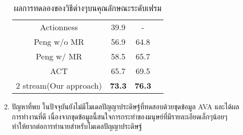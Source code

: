 \begin{enumerate}
\begin{enumerate}
\begin{table}[!ht]
\begin{tabular}{|c|c|c|c|}
					Actionness 			& 39.9				& 	-						\\
					Peng w/o MR			& 56.9				& 64.8						\\
					Peng w/  MR 			& 58.5				& 65.7						\\
					ACT					& 65.7				& 69.5						\\
					\hline
					2 stream(Our approach)		& \textbf{73.3}		& \textbf{76.3}				\\
					\hline
				\end{tabular}
				\caption{ผลการทดลองของวิธีต่างๆบนคุณลักษณะระดับเฟรม}
				\label{tab: transfer learning}
			\end{table}
		\item ปัญหาที่พบ
		ในปัจจุบันยังไม่มีโมเดลปัญญาประดิษฐ์ที่ทดสอบด้วยชุดข้อมูล AVA และได้ผลการทำงานที่ดี เนื่องจากชุดข้อมูลนี้สนใจการกระทำของมนุษย์ที่มีรายละเอียดเล็กๆน้อยๆ 
		ทำให้ยากต่อการทำนายสำหรับโมเดลปัญญาประดิษฐ์
	\end{enumerate}
\end{enumerate}